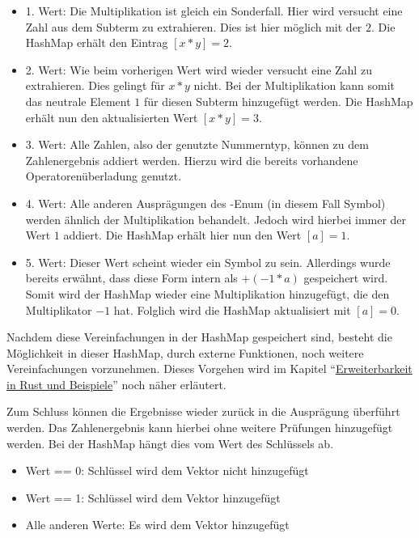 \documentclass[11pt,a4paper, ngerman]{article}
\begin{document}
\begin{itemize}
    \item 1. Wert: Die Multiplikation ist gleich ein Sonderfall. Hier wird versucht eine Zahl aus dem Subterm zu extrahieren. Dies ist hier möglich mit der $2$. Die HashMap erhält den Eintrag $[x*y] = 2$.
    \item 2. Wert: Wie beim vorherigen Wert wird wieder versucht eine Zahl zu extrahieren. Dies gelingt für $x*y$ nicht. Bei der Multiplikation kann somit das neutrale Element $1$ für diesen Subterm hinzugefügt werden. Die HashMap erhält nun den aktualisierten Wert $[x*y] = 3$.
    \item 3. Wert: Alle Zahlen, also der genutzte Nummerntyp, können zu dem Zahlenergebnis addiert werden. Hierzu wird die bereits vorhandene Operatorenüberladung genutzt.
    \item 4. Wert: Alle anderen Ausprägungen des -Enum (in diesem Fall Symbol) werden ähnlich der Multiplikation behandelt. Jedoch wird hierbei immer der Wert $1$ addiert. Die HashMap erhält hier nun den Wert $[a] = 1$.
    \item 5. Wert: Dieser Wert scheint wieder ein Symbol zu sein. Allerdings wurde bereits erwähnt, dass diese Form intern als $+(-1*a)$ gespeichert wird. Somit wird der HashMap wieder eine Multiplikation hinzugefügt, die den Multiplikator $-1$ hat. Folglich wird die HashMap aktualisiert mit $[a] = 0$.
\end{itemize}

Nachdem diese Vereinfachungen in der HashMap gespeichert sind, besteht die Möglichkeit in dieser HashMap, durch externe Funktionen, noch weitere Vereinfachungen vorzunehmen. Dieses Vorgehen wird im Kapitel ``\hyperref[sec:kapErRustUndBei]{Erweiterbarkeit in Rust und Beispiele}'' noch näher erläutert.

Zum Schluss können die Ergebnisse wieder zurück in die Ausprägung  überführt werden. Das Zahlenergebnis kann hierbei ohne weitere Prüfungen hinzugefügt werden. Bei der HashMap hängt dies vom Wert des Schlüssels ab. 

\begin{itemize}
    \item Wert == 0: Schlüssel wird dem Vektor nicht hinzugefügt
    \item Wert == 1: Schlüssel wird dem Vektor hinzugefügt
    \item Alle anderen Werte: Es wird dem Vektor  hinzugefügt
\end{itemize}
\end{document}

